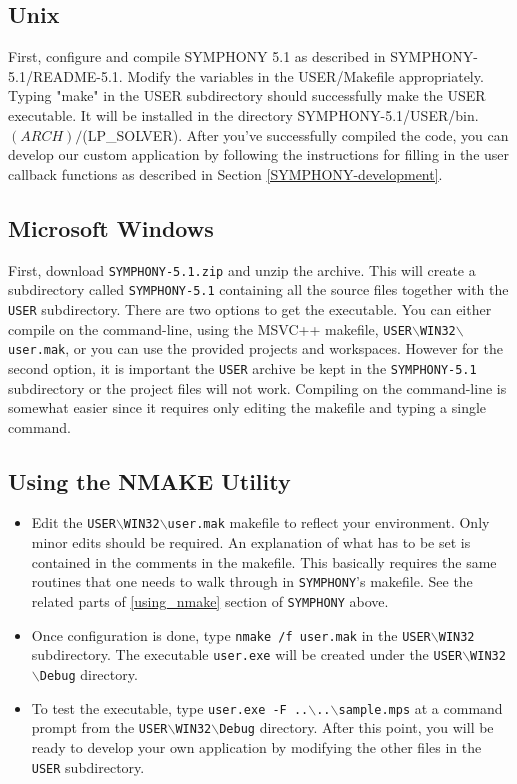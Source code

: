 \subsection{Unix}

First, configure and compile SYMPHONY 5.1 as described in
SYMPHONY-5.1/README-5.1. Modify the variables in the USER/Makefile
appropriately. Typing "make" in the USER subdirectory should successfully make
the USER executable. It will be installed in the directory
SYMPHONY-5.1/USER/bin.$(ARCH)/$(LP\_SOLVER).  After you've successfully
compiled the code, you can develop our custom application by following the
instructions for filling in the user callback functions as described in
Section \ref{SYMPHONY-development}.

\subsection{Microsoft Windows}

First, download \texttt{SYMPHONY-5.1.zip} and unzip the archive. This will
create a subdirectory called \texttt{SYMPHONY-5.1} containing all the source
files together with the \texttt{USER} subdirectory. There are two options to
get the executable. You can either compile on the command-line, using the
MSVC++ makefile,
\texttt{USER$\backslash$WIN32$\backslash$user.mak}, or you can use the 
provided projects and workspaces. However for the second option, it is 
important the \texttt{USER} archive be kept in the \texttt{SYMPHONY-5.1}
subdirectory or the project files will not work. Compiling on the 
command-line is somewhat easier since it requires only editing the makefile 
and typing a single command.

\subsection{Using the NMAKE Utility}

\begin{itemize}
\item 
Edit the \texttt{USER$\backslash$WIN32$\backslash$user.mak} makefile to reflect 
your environment. Only minor edits should be required. An explanation of 
what has to be set is contained in the comments in the makefile. This basically 
requires the same routines that one needs to walk through in 
\texttt{SYMPHONY}'s makefile. See the related parts of \ref{using_nmake} section 
of \texttt{SYMPHONY} above.

\item
Once configuration is done, type \texttt{nmake /f user.mak} in the 
\texttt{USER$\backslash$WIN32} subdirectory. The executable \texttt{user.exe} 
will be created under the \texttt{USER$\backslash$WIN32$\backslash$Debug} 
directory.

\item
To test the executable, type 
\texttt{user.exe -F ..$\backslash$..$\backslash$sample.mps} 
at a command prompt from the \texttt{USER$\backslash$WIN32$\backslash$Debug} 
directory. After this point, you will be ready to develop your own application 
by modifying the other files in the \texttt{USER} subdirectory.
\end{itemize}

